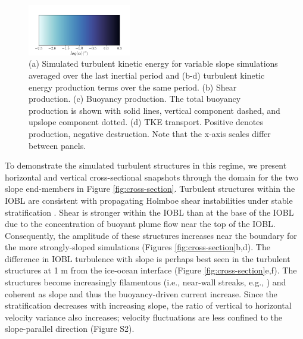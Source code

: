 \documentclass[draft]{agujournal2019}
\begin{document}
\begin{figure}
\begin{minipage}{0.5\textwidth}
    \end{minipage}
    \includegraphics[width=0.4\textwidth,trim={1cm 0cm 1cm 5cm}, clip]{Figures/colorbar_slope.png}
    \caption{(a) Simulated turbulent kinetic energy for variable slope simulations averaged over the last inertial period and (b-d) turbulent kinetic energy production terms over the same period. (b) Shear production. (c) Buoyancy production. The total buoyancy production is shown with solid lines, vertical component dashed, and upslope component dotted. (d) TKE transport. Positive denotes production, negative destruction. Note that the x-axis scales differ between panels.}
    \label{fig:tke_budget}
\end{figure}

To demonstrate the simulated turbulent structures in this regime, we present horizontal and vertical cross-sectional  snapshots through the domain for the two slope end-members in Figure \ref{fig:cross-section}. Turbulent structures within the IOBL are consistent with propagating Holmboe shear instabilities under stable stratification \cite{carpenter_identifying_2010}. Shear is stronger within the IOBL than at the base of the IOBL due to the concentration of buoyant plume flow near the top of the IOBL. Consequently, the amplitude of these structures increases near the boundary for the more strongly-sloped simulations (Figures \ref{fig:cross-section}b,d). The difference in IOBL turbulence with slope is perhaps best seen in the turbulent structures at 1 m from the ice-ocean interface (Figure \ref{fig:cross-section}e,f). The structures become increasingly filamentous (i.e., near-wall streaks, e.g., ) and coherent as slope and thus the buoyancy-driven current increase. Since the stratification decreases with increasing slope, the ratio of vertical to horizontal velocity variance also increases;  velocity fluctuations are less confined to the slope-parallel direction (Figure S2). 
\end{document}
